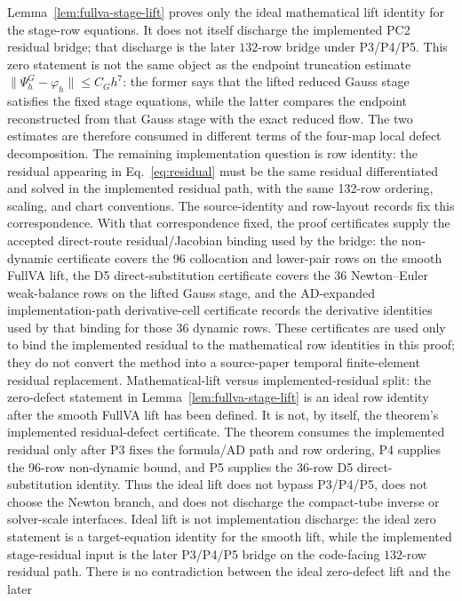 \documentclass[preprint,12pt]{elsarticle}
\begin{document}
Lemma~\ref{lem:fullva-stage-lift} proves only the ideal mathematical lift
identity for the stage-row equations.  It does not itself discharge the
implemented PC2 residual bridge; that discharge is the later \(132\)-row
bridge under P3/P4/P5.  This zero statement is not the same object as the
endpoint truncation estimate
\(\|\Psi_h^G-\varphi_h\|\le C_Gh^7\): the former says that the lifted reduced
Gauss stage satisfies the fixed stage equations, while the latter compares the
endpoint reconstructed from that Gauss stage with the exact reduced flow.  The
two estimates are therefore consumed in different terms of the four-map local
defect decomposition.  The remaining implementation question is row identity:
the residual appearing in Eq.~\eqref{eq:residual} must be the same residual
differentiated and solved in the implemented residual path, with the same
132-row ordering, scaling, and chart conventions. The source-identity and
row-layout records fix this correspondence. With that correspondence fixed,
the proof certificates supply the accepted direct-route residual/Jacobian
binding used by the bridge: the non-dynamic certificate covers the 96
collocation and lower-pair rows on the smooth FullVA lift, the D5
direct-substitution certificate covers the 36 Newton--Euler weak-balance rows
on the lifted Gauss stage, and the AD-expanded implementation-path
derivative-cell certificate records the derivative identities used by that
binding for those 36 dynamic rows. These certificates are used only to bind the
implemented residual to the mathematical row identities in this proof; they do
not convert the method into a source-paper temporal finite-element residual
replacement.
Mathematical-lift versus implemented-residual split: the zero-defect statement
in Lemma~\ref{lem:fullva-stage-lift} is an ideal row identity after the
smooth FullVA lift has been defined. It is not, by itself, the theorem's
implemented residual-defect certificate. The theorem consumes the implemented
residual only after P3 fixes the formula/AD path and row ordering, P4 supplies
the 96-row non-dynamic bound, and P5 supplies the 36-row D5 direct-substitution
identity. Thus the ideal lift does not bypass P3/P4/P5, does not choose the
Newton branch, and does not discharge the compact-tube inverse or solver-scale
interfaces.
Ideal lift is not implementation discharge: the ideal zero statement is a
target-equation identity for the smooth lift, while the implemented
stage-residual input is the later P3/P4/P5 bridge on the code-facing
\(132\)-row residual path.
There is no contradiction between the ideal zero-defect lift and the later
\end{document}
